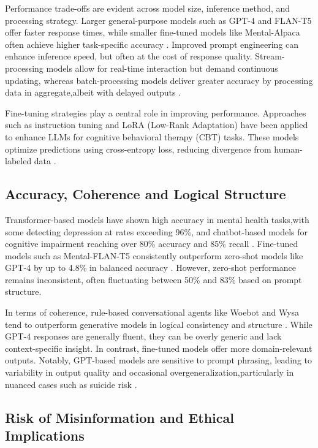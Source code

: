 Performance trade-offs are evident across model size, inference method, and processing strategy. Larger general-purpose models such as GPT-4 and FLAN-T5 offer faster response times, while smaller fine-tuned models like Mental-Alpaca often achieve higher task-specific accuracy \cite{xu2024}. Improved prompt engineering can enhance inference speed, but often at the cost of response quality. Stream-processing models allow for real-time interaction but demand continuous updating, whereas batch-processing models deliver greater accuracy by processing data in aggregate,albeit with delayed outputs \cite{mcgorry2025}.

Fine-tuning strategies play a central role in improving performance. Approaches such as instruction tuning and LoRA (Low-Rank Adaptation) have been applied to enhance LLMs for cognitive behavioral therapy (CBT) tasks. These models optimize predictions using cross-entropy loss, reducing divergence from human-labeled data \cite{na2024}.

\subsection{Accuracy, Coherence and Logical Structure}

Transformer-based models have shown high accuracy in mental health tasks,with some detecting depression at rates exceeding 96\%, and chatbot-based models for cognitive impairment reaching over 80\% accuracy and 85\% recall \cite{greco2023, mcgorry2025}. Fine-tuned models such as Mental-FLAN-T5 consistently outperform zero-shot models like GPT-4 by up to 4.8\% in balanced accuracy \cite{xu2024}. However, zero-shot performance remains inconsistent, often fluctuating between 50\% and 83\% based on prompt structure.

In terms of coherence, rule-based conversational agents like Woebot and Wysa tend to outperform generative models in logical consistency and structure \cite{stade2024}. While GPT-4 responses are generally fluent, they can be overly generic and lack context-specific insight. In contrast, fine-tuned models offer more domain-relevant outputs. Notably, GPT-based models are sensitive to prompt phrasing, leading to variability in output quality and occasional overgeneralization,particularly in nuanced cases such as suicide risk \cite{sejnowski2023}.

\subsection{Risk of Misinformation and Ethical Implications}

